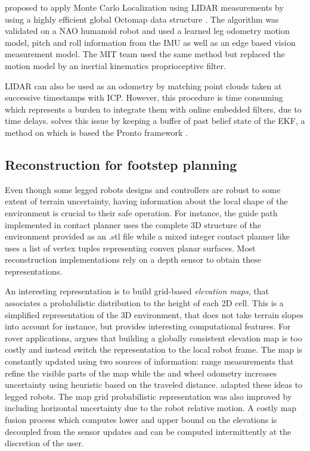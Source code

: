 \cite{hornung2014monte} proposed to apply Monte Carlo Localization using LIDAR measurements by using a highly efficient global Octomap data structure \cite{hornung2013octomap}.
The algorithm was validated on a NAO humanoid robot and used a learned leg odometry motion model, pitch and roll information from the IMU as well as an edge based vision measurement model.
The MIT team \cite{fallon2014drift} used the same method but replaced the motion model by an inertial kinematics proprioceptive filter. 

LIDAR can also be used as an odometry by matching point clouds taken at successive timestamps with ICP. However, this procedure is time consuming 
which represents a burden to integrate them with online embedded filters, due to time delays. \cite{nobili2017heterogeneous} solves this issue by keeping a
buffer of past belief state of the EKF, a method on which is based the Pronto framework \cite{camurri2020pronto}.



\subsection{Reconstruction for footstep planning}
Even though some legged robots designs and controllers \cite{reher2019dynamic, bledt2018cheetah} are robust to some extent of terrain uncertainty, having information about the local
shape of the environment is crucial to their safe operation. For instance, the guide path implemented in contact planner \cite{tonneau2018efficient} uses the complete 3D structure of the environment
provided as an .stl file while a mixed integer contact planner like \cite{tonneau2020sl1m} uses a list of vertex tuples representing convex planar surfaces.
Most reconstruction implementations rely on a depth sensor to obtain these representations.

An interesting representation is to build grid-based \textit{elevation maps}, that associates a probabilistic distribution to the height of each 2D cell. 
This is a simplified representation of the 3D environment, that does not take terrain slopes into account for instance, but provides interesting computational features. 
For rover applications, \cite{kleiner2007real} argues that building a globally consistent elevation map is too costly and instead switch the representation to the local robot frame. 
The map is constantly updated using two sources of information: range measurements that refine the visible parts of the map while the and wheel odometry increases uncertainty using heuristic
based on the traveled distance. \cite{fankhauser2014robot, fankhauser2018probabilistic} adapted these ideas to legged robots. The map grid probabilistic representation
was also improved by including horizontal uncertainty due to the robot relative motion. A costly map fusion process which computes lower and upper bound on the elevations
is decoupled from the sensor updates and can be computed intermittently at the discretion of the user. 

